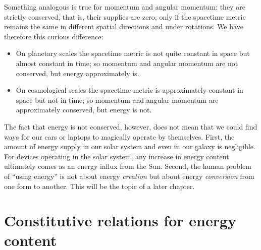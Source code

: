 \documentclass[a4paper,12pt,%
onecolumn,oneside,%
british%
]{memoir}
\newcommand{\mynotew}[1]{{\footnotesize\color{midgrey}\faIcon{tools}\ #1}}
\renewcommand*{\|}[1][]{\nonscript\:#1\vert\nonscript\:\mathopen{}}
\begin{document}
\medskip

Something analogous is true for momentum and angular momentum: they are strictly conserved, that is, their supplies are zero, only if the spacetime metric remains the same in different spatial directions and under rotations. We have therefore this curious difference:
\begin{itemize}
\item On planetary scales the spacetime metric is not quite constant in space but almost constant in time; so momentum and angular momentum are not conserved, but energy approximately is.
\item On cosmological scales the spacetime metric is approximately constant in space but not in time; so momentum and angular momentum are approximately conserved, but energy is not.
\end{itemize}

\medskip

The fact that energy is not conserved, however, does not mean that we could find ways for our cars or laptops to magically operate by themselves. First, the amount of energy supply in our solar system and even in our galaxy is negligible. %
For devices operating in the solar system, any increase in energy content ultimately comes as an energy influx from the Sun. Second, the human problem of \enquote{using energy} is not about energy \emph{creation} but about energy \emph{conversion} from one form to another. This will be the topic of a later chapter.


\section{Constitutive relations for energy content}
\label{sec:energy_constitutive}
\end{document}
